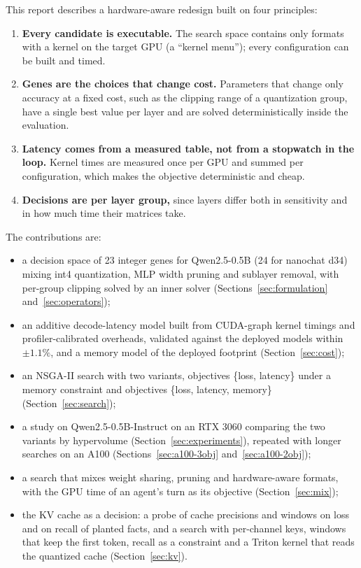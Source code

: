 \documentclass[11pt]{article}
\begin{document}
This report describes a hardware-aware redesign built on four principles:
\begin{enumerate}
  \item \textbf{Every candidate is executable.} The search space contains only formats with a kernel on
        the target GPU (a ``kernel menu''); every configuration can be built and timed.
  \item \textbf{Genes are the choices that change cost.} Parameters that change only accuracy at a fixed
        cost, such as the clipping range of a quantization group, have a single best value per layer and
        are solved deterministically inside the evaluation.
  \item \textbf{Latency comes from a measured table, not from a stopwatch in the loop.} Kernel times
        are measured once per GPU and summed per configuration, which makes the objective deterministic
        and cheap.
  \item \textbf{Decisions are per layer group,} since layers differ both in sensitivity and in how much
        time their matrices take.
\end{enumerate}

\noindent The contributions are:
\begin{itemize}
  \item a decision space of 23 integer genes for Qwen2.5-0.5B (24 for nanochat d34) mixing int4
        quantization, MLP width pruning and sublayer removal, with per-group clipping solved by an inner
        solver (Sections~\ref{sec:formulation} and~\ref{sec:operators});
  \item an additive decode-latency model built from CUDA-graph kernel timings and profiler-calibrated
        overheads, validated against the deployed models within $\pm1.1\%$, and a memory model of the
        deployed footprint (Section~\ref{sec:cost});
  \item an NSGA-II search with two variants, objectives \{loss, latency\} under a memory constraint and
        objectives \{loss, latency, memory\} (Section~\ref{sec:search});
  \item a study on Qwen2.5-0.5B-Instruct on an RTX 3060 comparing the two variants by hypervolume
        (Section~\ref{sec:experiments}), repeated with longer searches on an A100
        (Sections~\ref{sec:a100-3obj} and~\ref{sec:a100-2obj});
  \item a search that mixes weight sharing, pruning and hardware-aware formats, with the GPU time of an
        agent's turn as its objective (Section~\ref{sec:mix});
  \item the KV cache as a decision: a probe of cache precisions and windows on loss and on recall of
        planted facts, and a search with per-channel keys, windows that keep the first token, recall as a
        constraint and a Triton kernel that reads the quantized cache (Section~\ref{sec:kv}).
\end{itemize}
\end{document}
